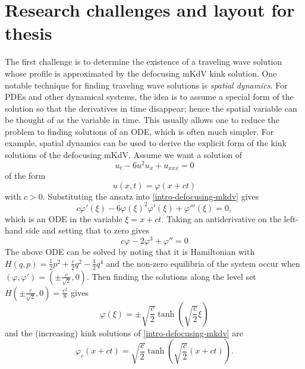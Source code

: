 \section{Research challenges and layout for thesis}

The first challenge is to determine the existence of a traveling wave solution whose profile is approximated by the defocusing mKdV kink solution. One notable technique for finding traveling wave solutions is \emph{spatial dynamics}. For PDEs and other dynamical systems, the idea is to assume a special form of the solution so that the derivatives in time disappear; hence the spatial variable can be thought of as the variable in time. This usually allows one to reduce the problem to finding solutions of an ODE, which is often much simpler. For example, spatial dynamics can be used to derive the explicit form of the kink solutions of the defocusing mKdV. Assume we want a solution of 
\begin{equation}\label{intro-defocusing-mkdv}
	u_t - 6u^2u_x + u_{xxx} = 0
\end{equation}
of the form
\begin{equation}
	u(x,t) = \varphi(x+ct) 
\end{equation}
with \(c > 0\). Substituting the ansatz into \cref{intro-defocusing-mkdv} gives
\begin{equation}
	c \varphi '(\xi) - 6\varphi(\xi)^2 \varphi'(\xi) + \varphi'''(\xi) = 0,
\end{equation}
which is an ODE in the variable \(\xi=x+ct\). Taking an antiderivative on the left-hand side and setting that to zero gives
\begin{equation}
	c\varphi  - 2 \varphi^3  + \varphi'' = 0
\end{equation}
The above ODE can be solved by noting that it is Hamiltonian with \(H(q,p) = \frac 1 2 p^2 + \frac c 2 q^2 - \frac 12 q^4\) and the non-zero equilibria of the system occur when \((\varphi, \varphi') = (\pm \frac c {\sqrt 2}, 0)\). Then finding the solutions along the level set \(H(\pm \frac c {\sqrt 2}, 0) = \frac {c^2} 8\) gives 
\begin{equation}
	\varphi(\xi) = \pm \sqrt{\frac c  2} \tanh\left( \sqrt{\frac c 2} \xi\right)
\end{equation}
and the (increasing) kink solutions of \cref{intro-defocusing-mkdv} are 
\begin{equation}\label{kink-soln-defocusing-mkdv}
	\varphi_c(x+ct) = \sqrt{\frac c 2} \tanh\left(\sqrt{\frac c 2} (x+ct) \right).
\end{equation}

